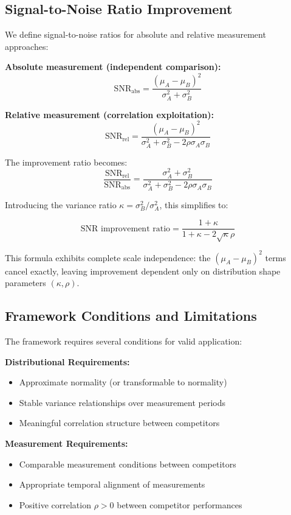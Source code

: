 \subsection{Signal-to-Noise Ratio Improvement}

We define signal-to-noise ratios for absolute and relative measurement approaches:

\textbf{Absolute measurement (independent comparison):}
$$\text{SNR}_{\text{abs}} = \frac{(\mu_A - \mu_B)^2}{\sigma_A^2 + \sigma_B^2}$$

\textbf{Relative measurement (correlation exploitation):}
$$\text{SNR}_{\text{rel}} = \frac{(\mu_A - \mu_B)^2}{\sigma_A^2 + \sigma_B^2 - 2\rho\sigma_A\sigma_B}$$

The improvement ratio becomes:
$$\frac{\text{SNR}_{\text{rel}}}{\text{SNR}_{\text{abs}}} = \frac{\sigma_A^2 + \sigma_B^2}{\sigma_A^2 + \sigma_B^2 - 2\rho\sigma_A\sigma_B}$$

Introducing the variance ratio $\kappa = \sigma_B^2/\sigma_A^2$, this simplifies to:

$$\text{SNR improvement ratio} = \frac{1 + \kappa}{1 + \kappa - 2\sqrt{\kappa}\rho}$$

This formula exhibits complete scale independence: the $(\mu_A - \mu_B)^2$ terms cancel exactly, leaving improvement dependent only on distribution shape parameters $(\kappa, \rho)$.

\subsection{Framework Conditions and Limitations}

The framework requires several conditions for valid application:

\textbf{Distributional Requirements:}
\begin{itemize}
    \item Approximate normality (or transformable to normality)
    \item Stable variance relationships over measurement periods
    \item Meaningful correlation structure between competitors
\end{itemize}

\textbf{Measurement Requirements:}
\begin{itemize}
    \item Comparable measurement conditions between competitors
    \item Appropriate temporal alignment of measurements
    \item Positive correlation $\rho > 0$ between competitor performances
\end{itemize}


